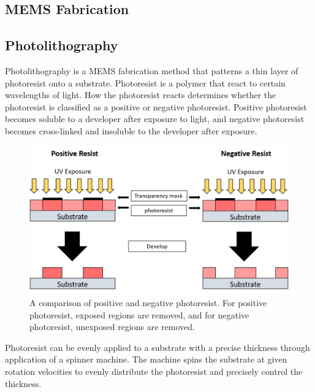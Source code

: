  \subsection{MEMS Fabrication}
 
 \subsection*{Photolithography}
 
 \par Photolithography is a MEMS fabrication method that patterns a thin layer of photoresist onto a substrate. Photoresist is a polymer that react to certain wavelengths of light. How the photoresist reacts determines whether the photoresist is classified as a positive or negative photoresist. Positive photoresist becomes soluble to a developer after exposure to light, and negative photoresist becomes cross-linked and insoluble to the developer after exposure. 
 
 \begin{figure}[h]
     \centering
     \includegraphics[width=\textwidth]{images/negative_vs_positive_resist.png}
     \caption[A comparison of positive and negative photoresist]{A comparison of positive and negative photoresist. For positive photoresist, exposed regions are removed, and for negative photoresist, unexposed regions are removed.}
     \label{fig:negative_vs_positive_resist}
 \end{figure}
 
 \par Photoresist can be evenly applied to a substrate with a precise thickness through application of a spinner machine. The machine spins the substrate at given rotation velocities to evenly distribute the photoresist and precisely control the thickness. 
 
